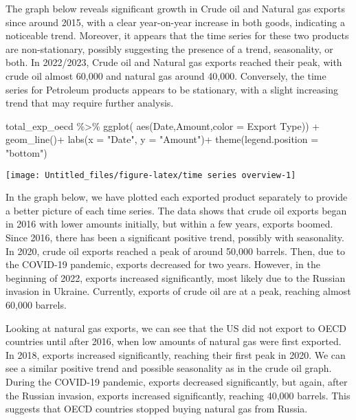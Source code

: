 \documentclass[
]{article}
\newenvironment{Shaded}{\begin{snugshade}}{\end{snugshade}}
\newcommand{\AttributeTok}[1]{\textcolor[rgb]{0.77,0.63,0.00}{#1}}
\newcommand{\FunctionTok}[1]{\textcolor[rgb]{0.00,0.00,0.00}{#1}}
\newcommand{\NormalTok}[1]{#1}
\newcommand{\SpecialCharTok}[1]{\textcolor[rgb]{0.00,0.00,0.00}{#1}}
\newcommand{\StringTok}[1]{\textcolor[rgb]{0.31,0.60,0.02}{#1}}
\begin{document}
The graph below reveals significant growth in Crude oil and Natural gas
exports since around 2015, with a clear year-on-year increase in both
goods, indicating a noticeable trend. Moreover, it appears that the time
series for these two products are non-stationary, possibly suggesting
the presence of a trend, seasonality, or both. In 2022/2023, Crude oil
and Natural gas exports reached their peak, with crude oil almost 60,000
and natural gas around 40,000. Conversely, the time series for Petroleum
products appears to be stationary, with a slight increasing trend that
may require further analysis.

\begin{Shaded}
\begin{Highlighting}[]
\NormalTok{total\_exp\_oecd }\SpecialCharTok{\%\textgreater{}\%} \FunctionTok{ggplot}\NormalTok{(}
 \FunctionTok{aes}\NormalTok{(Date,Amount,}\AttributeTok{color =} \StringTok{\textasciigrave{}}\AttributeTok{Export Type}\StringTok{\textasciigrave{}}\NormalTok{)) }\SpecialCharTok{+}
   \FunctionTok{geom\_line}\NormalTok{()}\SpecialCharTok{+}
   \FunctionTok{labs}\NormalTok{(}\AttributeTok{x =} \StringTok{"Date"}\NormalTok{, }\AttributeTok{y =} \StringTok{"Amount"}\NormalTok{)}\SpecialCharTok{+}
  \FunctionTok{theme}\NormalTok{(}\AttributeTok{legend.position =} \StringTok{"bottom"}\NormalTok{)}
\end{Highlighting}
\end{Shaded}

\begin{center}\texttt{[image: Untitled\_files/figure-latex/time series overview-1]} \end{center}

In the graph below, we have plotted each exported product separately to
provide a better picture of each time series. The data shows that crude
oil exports began in 2016 with lower amounts initially, but within a few
years, exports boomed. Since 2016, there has been a significant positive
trend, possibly with seasonality. In 2020, crude oil exports reached a
peak of around 50,000 barrels. Then, due to the COVID-19 pandemic,
exports decreased for two years. However, in the beginning of 2022,
exports increased significantly, most likely due to the Russian invasion
in Ukraine. Currently, exports of crude oil are at a peak, reaching
almost 60,000 barrels.

Looking at natural gas exports, we can see that the US did not export to
OECD countries until after 2016, when low amounts of natural gas were
first exported. In 2018, exports increased significantly, reaching their
first peak in 2020. We can see a similar positive trend and possible
seasonality as in the crude oil graph. During the COVID-19 pandemic,
exports decreased significantly, but again, after the Russian invasion,
exports increased significantly, reaching 40,000 barrels. This suggests
that OECD countries stopped buying natural gas from Russia.
\end{document}
